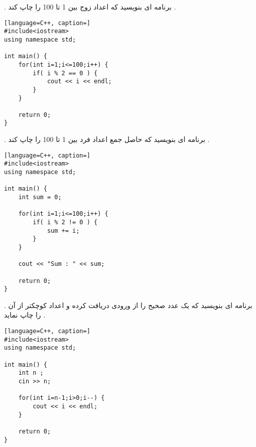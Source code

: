\documentclass[12pt]{article}
\begin{document}
\newpage


 . برنامه ای بنویسید که اعداد زوج بین 1 تا 100 را چاپ کند .





\begin{latin}
\begin{lstlisting}[language=C++, caption=]
#include<iostream>
using namespace std;

int main() {
	for(int i=1;i<=100;i++) {
		if( i % 2 == 0 ) {
			cout << i << endl;
		}
	}

	return 0;
}
\end{lstlisting}
\end{latin}








 . برنامه ای بنویسید که حاصل جمع اعداد فرد بین 1 تا 100 را چاپ کند .





\begin{latin}
\begin{lstlisting}[language=C++, caption=]
#include<iostream>
using namespace std;

int main() {
	int sum = 0;
	
	for(int i=1;i<=100;i++) {
		if( i % 2 != 0 ) {
			sum += i;
		}
	}
	
	cout << "Sum : " << sum;
	
	return 0;
}
\end{lstlisting}
\end{latin}






\newpage

 . برنامه ای بنویسید که یک عدد صحیح را از ورودی دریافت کرده و اعداد کوچکتر از آن را چاپ نماید .





\begin{latin}
\begin{lstlisting}[language=C++, caption=]
#include<iostream>
using namespace std;

int main() {
	int n ;
	cin >> n;
	
	for(int i=n-1;i>0;i--) {
		cout << i << endl;
	}

	return 0;
}
\end{lstlisting}
\end{latin}
\end{document}
